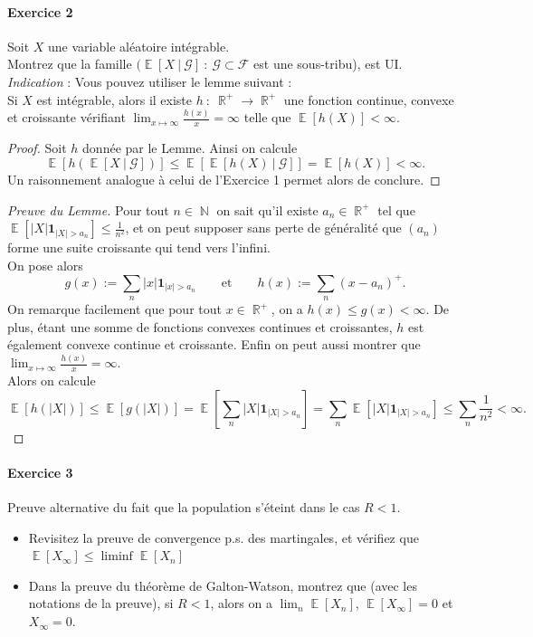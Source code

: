 \documentclass{article}
\theoremstyle{definition}
\numberwithin{equation}{section}
\DeclareMathOperator{\R}{\mathbb{R}}
\DeclareMathOperator{\N}{\mathbb{N}}
\DeclareMathOperator{\E}{\mathbb{E}}
\begin{document}


\paragraph{Exercice 2} Soit $X$ une variable aléatoire intégrable.\\
Montrez que la famille $(\E[X~|~\mathcal{G}]~:~\mathcal{G}\subset \mathcal{F}$ est une sous-tribu), est UI.\\
\textit{Indication} : Vous pouvez utiliser le lemme suivant :\\
{\small Si $X$ est intégrable, alors il existe $h~:~\R^+\to \R^+$ une fonction continue, convexe et croissante vérifiant $\lim_{x\mapsto \infty} \frac{h(x)}{x}=\infty$ telle que $\E[h(X)]<\infty$.}

\begin{proof}
 Soit $h$ donnée par le Lemme. Ainsi on calcule
 $$ \E[h(\E[X~|~\mathcal{G}])] \leq \E[\E[h(X)~|~\mathcal{G}]] = \E[h(X)] < \infty. $$
 Un raisonnement analogue à celui de l'Exercice 1 permet alors de conclure.
\end{proof}
\begin{proof}[Preuve du Lemme]
 Pour tout $n\in\N$ on sait qu'il existe $a_n\in\R^+$ tel que $\E[|X|\mathbf{1}_{|X|>a_n}]\leq \frac{1}{n^2}$, et on peut supposer sans perte de généralité que $(a_n)$ forme une suite croissante qui tend vers l'infini.\\
 On pose alors 
 $$g(x) := \sum_n |x| \mathbf{1}_{|x|>a_n} \qquad \text{et} \qquad h(x):=\sum_n (x-a_n)^+.$$
 On remarque facilement que pour tout $x\in\R^+$, on a $h(x)\leq g(x) <\infty$. De plus, étant une somme de fonctions convexes continues et croissantes, $h$ est également convexe continue et croissante. Enfin on peut aussi montrer que $\lim_{x\mapsto \infty} \frac{h(x)}{x}=\infty$.\\
 Alors on calcule
$$
\E[h(|X|)] \leq \E[g(|X|)] = \E\left[ \sum_n |X|\mathbf{1}_{|X|>a_n} \right] = \sum_n \E[|X|\mathbf{1}_{|X|>a_n}]\leq \sum_n \dfrac{1}{n^2}<\infty.
$$
\end{proof}


\paragraph{Exercice 3} Preuve alternative du fait que la population s'éteint dans le cas $R < 1$.
\begin{itemize}
    \item Revisitez la preuve de convergence p.s. des martingales, et vérifiez que $\E[X_\infty] \leq \liminf \E[X_n]$
    \item Dans la preuve du théorème de Galton-Watson, montrez que (avec les notations de la preuve), si $R<1$, alors on a $\lim_n\E[X_n]$, $\E[X_\infty]=0$ et $X_\infty =0$. 
\end{itemize}
\end{document}
